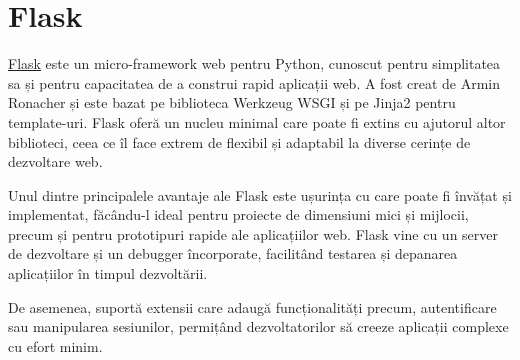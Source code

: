 \section{Flask}

\href{https://flask.palletsprojects.com/en/3.0.x/}{Flask} este un micro-framework web pentru Python, cunoscut pentru simplitatea sa și pentru capacitatea de a construi rapid aplicații web. A fost creat de Armin Ronacher și este bazat pe biblioteca Werkzeug WSGI și pe Jinja2 pentru template-uri. Flask oferă un nucleu minimal care poate fi extins cu ajutorul altor biblioteci, ceea ce îl face extrem de flexibil și adaptabil la diverse cerințe de dezvoltare web.

Unul dintre principalele avantaje ale Flask este ușurința cu care poate fi învățat și implementat, făcându-l ideal pentru proiecte de dimensiuni mici și mijlocii, precum și pentru prototipuri rapide ale aplicațiilor web. Flask vine cu un server de dezvoltare și un debugger încorporate, facilitând testarea și depanarea aplicațiilor în timpul dezvoltării. 

De asemenea, suportă extensii care adaugă funcționalități precum, autentificare sau manipularea sesiunilor, permițând dezvoltatorilor să creeze aplicații complexe cu efort minim. 